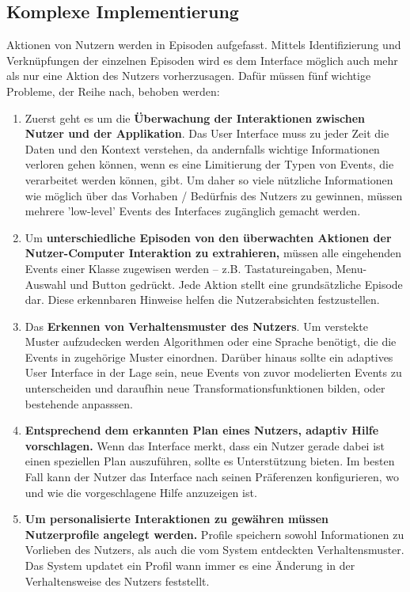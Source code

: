 \subsection{Komplexe Implementierung}
Aktionen von Nutzern werden in Episoden aufgefasst. Mittels Identifizierung und Verknüpfungen der einzelnen 
Episoden wird es dem Interface möglich auch mehr als nur eine Aktion des Nutzers vorherzusagen. 
Dafür müssen fünf wichtige Probleme, der Reihe nach, behoben werden: 
\begin{enumerate}
    \item Zuerst geht es um die \textbf{Überwachung der Interaktionen zwischen Nutzer und der Applikation}. Das User Interface 
    muss zu jeder Zeit die Daten und den Kontext verstehen, da andernfalls wichtige Informationen verloren gehen können, wenn 
    es eine Limitierung der Typen von Events, die verarbeitet werden können, gibt. Um daher so viele nützliche Informationen wie möglich 
    über das Vorhaben / Bedürfnis des Nutzers zu gewinnen, müssen mehrere 'low-level' Events des Interfaces zugänglich gemacht werden.
    \item Um \textbf{unterschiedliche Episoden von den überwachten Aktionen der Nutzer-Computer Interaktion zu extrahieren,} 
    müssen alle eingehenden Events einer Klasse zugewisen werden -- z.B. Tastatureingaben, Menu-Auswahl und Button gedrückt. Jede Aktion 
    stellt eine grundsätzliche Episode dar. Diese erkennbaren Hinweise helfen die Nutzerabsichten festzustellen.
    \item Das \textbf{Erkennen von Verhaltensmuster des Nutzers}. Um verstekte Muster aufzudecken werden Algorithmen oder eine Sprache 
    benötigt, die die Events in zugehörige Muster einordnen. Darüber hinaus sollte ein adaptives User Interface in der Lage sein, 
    neue Events von zuvor modelierten Events zu unterscheiden und daraufhin neue Transformationsfunktionen bilden, oder bestehende anpasssen.
    \item \textbf{Entsprechend dem erkannten Plan eines Nutzers, adaptiv Hilfe vorschlagen.} Wenn das Interface merkt, dass ein Nutzer 
    gerade dabei ist einen speziellen Plan auszuführen, sollte es Unterstützung bieten. Im besten Fall kann der Nutzer das Interface 
    nach seinen Präferenzen konfigurieren, wo und wie die vorgeschlagene Hilfe anzuzeigen ist.
    \item \textbf{Um personalisierte Interaktionen zu gewähren müssen Nutzerprofile angelegt werden.} Profile speichern sowohl Informationen 
    zu Vorlieben des Nutzers, als auch die vom System entdeckten Verhaltensmuster. Das System updatet ein Profil wann immer es 
    eine Änderung in der Verhaltensweise des Nutzers feststellt.
\end{enumerate}


